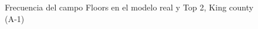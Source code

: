 \begin{figure}[H]
    \centering
    
    \caption{Frecuencia del campo Floors en el modelo real y Top 2, King county (A-1)}
    \label{frecuency-top2-floors}
\end{figure}